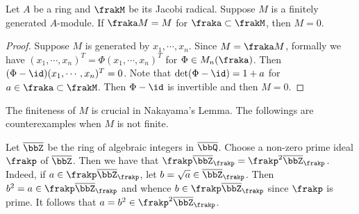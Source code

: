     \begin{theorem}\label{thm: Nakayama's lemma}
        Let $A$ be a ring and $\frakM$ be its Jacobi radical.
        Suppose $M$ is a finitely generated $A$-module.
        If $\fraka M = M$ for $\fraka \subset \frakM$, then $M = 0$.
    \end{theorem}
    \begin{proof}
        Suppose $M$ is generated by $x_1,\cdots,x_n$.
        Since $M = \fraka M$, formally we have $(x_1,\cdots,x_n)^T = \Phi (x_1,\cdots, x_n)^T$ for $\Phi \in M_n(\fraka)$.
        Then $(\Phi - \id) (x_1,\cdots, x_n)^T = 0$. 
        Note that $\det (\Phi - \id) = 1+a$ for $a \in \fraka \subset \frakM$.
        Then $\Phi-\id$ is invertible and then $M=0$.
    \end{proof}

        


    The finiteness of $M$ is crucial in Nakayama's Lemma.
    The followings are counterexamples when \(M\) is not finite.

    \begin{example}\label{eg:counterexample_of_Nakayama's_lemma_rings_of_algebraic_integers}
        Let \(\overline{\bbZ}\) be the ring of algebraic integers in \(\overline{\bbQ}\).
        Choose a non-zero prime ideal \(\frakp\) of \(\overline{\bbZ}\).
        Then we have that \(\frakp \overline{\bbZ}_\frakp= \frakp^2 \overline{\bbZ}_\frakp\).
        Indeed, if \(a \in \frakp \overline{\bbZ}_\frakp\), let \(b = \sqrt{a} \in \overline{\bbZ}_\frakp\).
        Then \(b^2 = a \in \frakp \overline{\bbZ}_\frakp\) and whence \(b \in \frakp \overline{\bbZ}_\frakp\) since \(\frakp\) is prime.
        It follows that \(a = b^2 \in \frakp^2 \overline{\bbZ}_\frakp\).
    \end{example}

